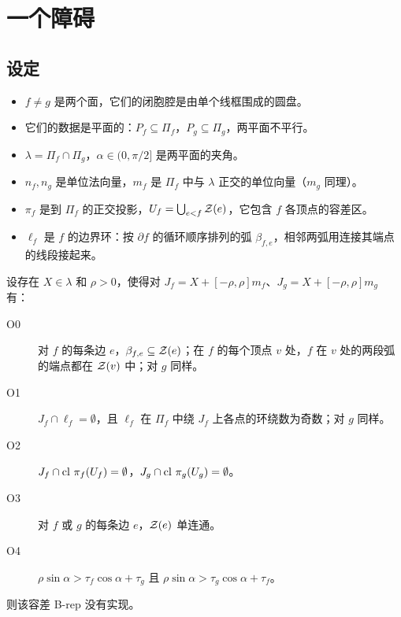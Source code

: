 \section{一个障碍}\label{sec:obstruction}

\subsection{设定}
\begin{itemize}
\item $f\ne g$ 是两个面，它们的闭胞腔是由单个线框围成的圆盘。
\item 它们的数据是平面的：$P_f\subseteq\Pi_f$，$P_g\subseteq\Pi_g$，两平面不平行。
\item $\lambda=\Pi_f\cap\Pi_g$，$\alpha\in(0,\pi/2]$ 是两平面的夹角。
\item $n_f,n_g$ 是单位法向量，$m_f$ 是 $\Pi_f$ 中与 $\lambda$ 正交的单位向量（$m_g$ 同理）。
\item $\pi_f$ 是到 $\Pi_f$ 的正交投影，$U_f=\bigcup_{e<f}\mathcal{Z}(e)$，它包含 $f$ 各顶点的容差区。
\item $\ell_f$ 是 $f$ 的边界环：按 $\partial f$ 的循环顺序排列的弧 $\beta_{f,e}$，相邻两弧用连接其端点的线段接起来。
\end{itemize}

\begin{theorem}[障碍]\label{thm:obstruction}
设存在 $X\in\lambda$ 和 $\rho>0$，使得对 $J_f=X+[-\rho,\rho]m_f$、$J_g=X+[-\rho,\rho]m_g$ 有：
\begin{description}
\item[O0] 对 $f$ 的每条边 $e$，$\beta_{f,e}\subseteq\mathcal{Z}(e)$；在 $f$ 的每个顶点 $v$ 处，$f$ 在 $v$ 处的两段弧的端点都在 $\mathcal{Z}(v)$ 中；对 $g$ 同样。
\item[O1] $J_f\cap\ell_f=\emptyset$，且 $\ell_f$ 在 $\Pi_f$ 中绕 $J_f$ 上各点的环绕数为奇数；对 $g$ 同样。
\item[O2] $J_f\cap\operatorname{cl}\,\pi_f(U_f)=\emptyset$，$J_g\cap\operatorname{cl}\,\pi_g(U_g)=\emptyset$。
\item[O3] 对 $f$ 或 $g$ 的每条边 $e$，$\mathcal{Z}(e)$ 单连通。
\item[O4] $\rho\sin\alpha>\tau_f\cos\alpha+\tau_g$ 且 $\rho\sin\alpha>\tau_g\cos\alpha+\tau_f$。
\end{description}
则该容差 B-rep 没有实现。
\end{theorem}

